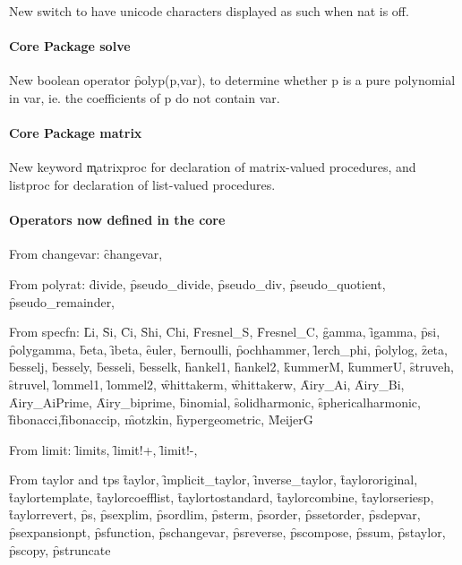New switch  to have unicode characters
displayed as such when nat is off.

\paragraph*{Core Package solve}

New boolean operator \f{polyp}(p,var), to determine whether p is a pure polynomial
in var, ie. the coefficients of p do not contain var.

\paragraph*{Core Package matrix}

New keyword \k{matrixproc} for declaration of matrix-valued procedures, and listproc for declaration of list-valued procedures.

\paragraph*{Operators now defined in the \REDUCE core}

From changevar: \f{changevar},

From polyrat: \f{divide}, \f{pseudo\_divide}, \f{pseudo\_div}, \f{pseudo\_quotient}, \f{pseudo\_remainder},

From specfn:
\f{Li}, \f{Si}, \f{Ci}, \f{Shi}, \f{Chi},
\f{Fresnel\_S}, \f{Fresnel\_C},
\f{gamma}, \f{igamma}, \f{psi}, \f{polygamma}, \f{beta}, \f{ibeta},
\f{euler},
\f{bernoulli}, \f{pochhammer}, \f{lerch\_phi}, \f{polylog}, \f{zeta},
\f{besselj},
\f{bessely},
\f{besseli},
\f{besselk},
\f{hankel1},
\f{hankel2},
\f{kummerM},
\f{kummerU},
\f{struveh},
\f{struvel},
\f{lommel1},
\f{lommel2},
\f{whittakerm},
\f{whittakerw},
\f{Airy\_Ai},
\f{Airy\_Bi},
\f{Airy\_AiPrime},
\f{Airy\_biprime},
\f{binomial},
\f{solidharmonic},
\f{sphericalharmonic},
\f{fibonacci},\f{fibonaccip},
\f{motzkin},
\f{hypergeometric}, \f{MeijerG}

From limit:
\f{limits}, \f{limit!+}, \f{limit!-},

From taylor and tps
\f{taylor}, \f{implicit\_taylor}, \f{inverse\_taylor},
\f{taylororiginal}, \f{taylortemplate}, \f{taylorcoefflist}, \f{taylortostandard}, \f{taylorcombine}, \f{taylorseriesp},
\f{taylorrevert},
\f{ps},
\f{psexplim}, \f{psordlim}, \f{psterm}, \f{psorder}, \f{pssetorder}, \f{psdepvar}, \f{psexpansionpt},
\f{psfunction}, \f{pschangevar}, \f{psreverse}, \f{pscompose}, \f{pssum}, \f{pstaylor}, \f{pscopy}, \f{pstruncate}

